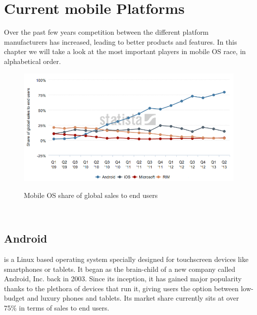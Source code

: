 \chapter{Current mobile Platforms}\label{ch:m_plats} %
Over the past few years competition between the different platform manufacturers has increased, leading to better products and features. In this chapter we will take a look at the most important players in mobile OS race, in alphabetical order.

\begin{figure}[H]
    \begin{center}
        {\includegraphics[width=1\linewidth]{gfx/statista-mobile}}
        \caption[Mobile OS share of global sales to end users]{Mobile OS share of global sales to end users\footnotemark}\label{fig:trend}
    \end{center}
\end{figure}
\\

\section{Android}
 is a Linux based operating system specially designed for touchscreen devices like smartphones or tablets. It began as the brain-child of a new company called Android, Inc. back in 2003. Since its inception, it has gained major popularity thanks to the plethora of devices that run it, giving users the option between low-budget and luxury phones and tablets. Its market share currently sits at over 75\% in terms of sales to end users.

